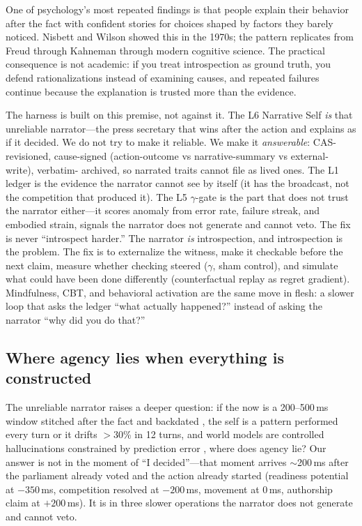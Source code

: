 \documentclass[11pt]{article}
\begin{document}
One of psychology's most repeated findings is that people explain their
behavior after the fact with confident stories for choices shaped by
factors they barely noticed. Nisbett and Wilson showed this in the
1970s; the pattern replicates from Freud through Kahneman through modern
cognitive science. The practical consequence is not academic: if you
treat introspection as ground truth, you defend rationalizations instead
of examining causes, and repeated failures continue because the
explanation is trusted more than the evidence.

The harness is built on this premise, not against it. The L6 Narrative
Self \emph{is} that unreliable narrator---the press secretary that wins
after the action and explains as if it decided. We do not try to make
it reliable. We make it \emph{answerable}: CAS-revisioned, cause-signed
(action-outcome vs narrative-summary vs external-write), verbatim-
archived, so narrated traits cannot file as lived ones. The L1 ledger
is the evidence the narrator cannot see by itself (it has the broadcast,
not the competition that produced it). The L5 $\gamma$-gate is the part
that does not trust the narrator either---it scores anomaly from error
rate, failure streak, and embodied strain, signals the narrator does not
generate and cannot veto. The fix is never ``introspect harder.'' The
narrator \emph{is} introspection, and introspection is the problem.
The fix is to externalize the witness, make it checkable before the
next claim, measure whether checking steered ($\gamma$, sham control),
and simulate what could have been done differently (counterfactual
replay as regret gradient). Mindfulness, CBT, and behavioral
activation are the same move in flesh: a slower loop that asks the
ledger ``what actually happened?'' instead of asking the narrator ``why
did you do that?''

\subsection{Where agency lies when everything is constructed}

The unreliable narrator raises a deeper question: if the now is a
200--500\,ms window stitched after the fact and backdated
\citep{libet1983,wegner2002}, the self is a pattern performed every
turn or it drifts $>$30\% in 12 turns, and world models are controlled
hallucinations constrained by prediction error \citep{seth2021beingyou}, where
does agency lie? Our answer is not in the moment of ``I decided''---that
moment arrives $\sim$200\,ms after the parliament already voted and the
action already started (readiness potential at $-350$\,ms, competition
resolved at $-200$\,ms, movement at $0$\,ms, authorship claim at
$+200$\,ms). It is in three slower operations the narrator does not
generate and cannot veto.
\end{document}
